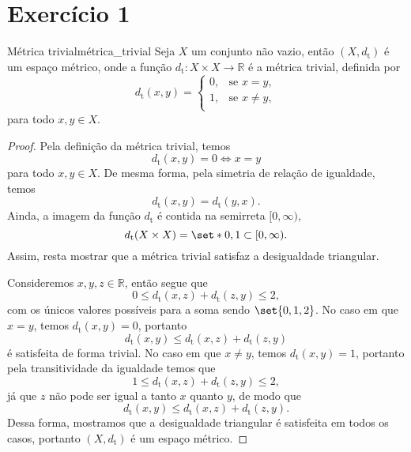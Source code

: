 \section*{Exercício 1}
\begin{proposition}{Métrica trivial}{métrica_trivial}
    Seja \(X\) um conjunto não vazio, então \((X, d_\mathrm{t})\) é um espaço métrico, onde a função \(d_\mathrm{t} : X \times X \to \mathbb{R}\) é a métrica trivial, definida por
    \begin{equation*}
        d_\mathrm{t}(x,y) = \begin{cases}
            0, & \text{se }x=y,\\
            1, & \text{se }x\neq y,\\
        \end{cases}
    \end{equation*}
    para todo \(x,y \in X\).
\end{proposition}
\begin{proof}
    Pela definição da métrica trivial, temos
    \begin{equation*}
        d_\mathrm{t}(x,y) = 0 \iff x = y
    \end{equation*}
    para todo \(x,y \in X\). De mesma forma, pela simetria de relação de igualdade, temos
    \begin{equation*}
        d_\mathrm{t}(x,y) = d_\mathrm{t}(y,x).
    \end{equation*}
    Ainda, a imagem da função \(d_\mathrm{t}\) é contida na semirreta \([0,\infty)\),
    \begin{equation*}
        d_\mathrm{t}(X\times X) = \set*{0, 1} \subset [0, \infty).
    \end{equation*}
    Assim, resta mostrar que a métrica trivial satisfaz a desigualdade triangular.

    Consideremos \(x,y,z \in \mathbb{R}\), então segue que
    \begin{equation*}
        0 \leq d_\mathrm{t}(x,z) + d_\mathrm{t}(z,y) \leq 2,
    \end{equation*}
    com os únicos valores possíveis para a soma sendo \(\set{0,1,2}\). No caso em que \(x = y\), temos \(d_\mathrm{t}(x,y) = 0\), portanto
    \begin{equation*}
        d_\mathrm{t}(x,y) \leq d_\mathrm{t}(x,z) + d_\mathrm{t}(z,y)
    \end{equation*}
    é satisfeita de forma trivial. No caso em que \(x \neq y\), temos \(d_\mathrm{t}(x,y) = 1\), portanto pela transitividade da igualdade temos que
    \begin{equation*}
        1 \leq d_\mathrm{t}(x,z) + d_\mathrm{t}(z,y) \leq 2,
    \end{equation*}
    já que \(z\) não pode ser igual a tanto \(x\) quanto \(y\), de modo que
    \begin{equation*}
        d_\mathrm{t}(x,y) \leq d_\mathrm{t}(x,z) + d_\mathrm{t}(z,y).
    \end{equation*}
    Dessa forma, mostramos que a desigualdade triangular é satisfeita em todos os casos, portanto \((X,d_\mathrm{t})\) é um espaço métrico.
\end{proof}
